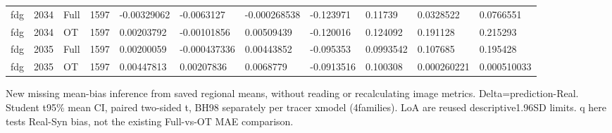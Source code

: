 \begin{landscape}
\begin{longtable}{lllllllllll}
fdg & 2034 & Full & 1597 & -0.00329062 & -0.0063127 & -0.000268538 & -0.123971 & 0.11739 & 0.0328522 & 0.0766551 \\
fdg & 2034 & OT & 1597 & 0.00203792 & -0.00101856 & 0.00509439 & -0.120016 & 0.124092 & 0.191128 & 0.215293 \\
fdg & 2035 & Full & 1597 & 0.00200059 & -0.000437336 & 0.00443852 & -0.095353 & 0.0993542 & 0.107685 & 0.195428 \\
fdg & 2035 & OT & 1597 & 0.00447813 & 0.00207836 & 0.0068779 & -0.0913516 & 0.100308 & 0.000260221 & 0.000510033 \\
\end{longtable}
\noindent\parbox{\linewidth}{\footnotesize New missing mean-bias inference from saved regional means, without reading or recalculating image metrics. Delta=prediction-Real. Student t95\% mean CI, paired two-sided t, BH98 separately per tracer xmodel (4families). LoA are reused descriptive1.96SD limits. q here tests Real-Syn bias, not the existing Full-vs-OT MAE comparison.}
\endgroup
\end{landscape}
